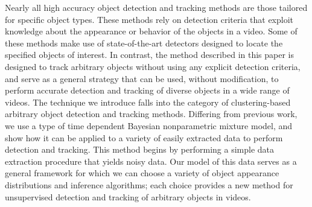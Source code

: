 \documentclass[twocolumn, final]{svjour3}
\begin{document}
Nearly all high accuracy object detection and tracking methods are those tailored for specific object types. These methods rely on detection criteria that exploit knowledge about the appearance or behavior of the objects in a video. Some of these methods make use of state-of-the-art detectors designed to locate the specified objects of interest. In contrast, the method described in this paper is designed to track arbitrary objects without using any explicit detection criteria, and serve as a general strategy that can be used, without modification, to perform accurate detection and tracking of diverse objects in a wide range of videos. The technique we introduce falls into the category of clustering-based arbitrary object detection and tracking methods. Differing from previous work, we use a type of time dependent Bayesian nonparametric mixture model, and show how it can be applied to a variety of easily extracted data to perform detection and tracking. This method begins by performing a simple data extraction procedure that yields noisy data. Our model of this data serves as a general framework for which we can choose a variety of object appearance distributions and inference algorithms; each choice provides a new method for unsupervised detection and tracking of arbitrary objects in videos.


\end{document}
